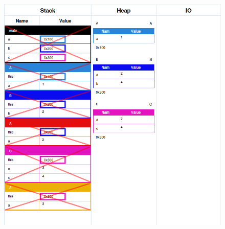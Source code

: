 \documentclass{article}
\begin{document}
\begin{figure}[H]
	\centering
	\includegraphics{polymorphism.png}
\end{figure}
\end{document}
